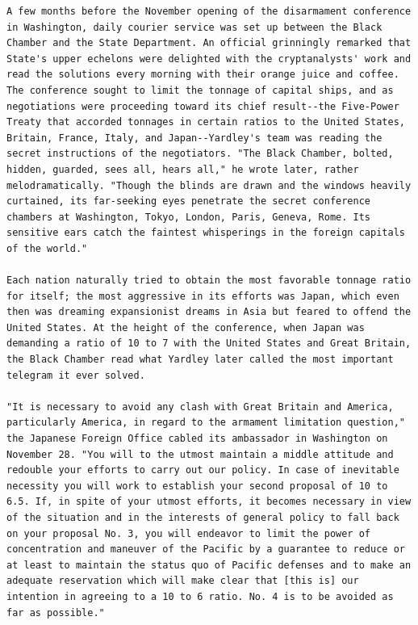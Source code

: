 \documentclass[11pt,a4paper]{article}
\begin{document}
\begin{lstlisting}[style=plaintext,caption={Recovered plaintext with restored word spacing}]
A few months before the November opening of the disarmament conference in Washington, daily courier service was set up between the Black Chamber and the State Department. An official grinningly remarked that State's upper echelons were delighted with the cryptanalysts' work and read the solutions every morning with their orange juice and coffee. The conference sought to limit the tonnage of capital ships, and as negotiations were proceeding toward its chief result--the Five-Power Treaty that accorded tonnages in certain ratios to the United States, Britain, France, Italy, and Japan--Yardley's team was reading the secret instructions of the negotiators. "The Black Chamber, bolted, hidden, guarded, sees all, hears all," he wrote later, rather melodramatically. "Though the blinds are drawn and the windows heavily curtained, its far-seeking eyes penetrate the secret conference chambers at Washington, Tokyo, London, Paris, Geneva, Rome. Its sensitive ears catch the faintest whisperings in the foreign capitals of the world."

Each nation naturally tried to obtain the most favorable tonnage ratio for itself; the most aggressive in its efforts was Japan, which even then was dreaming expansionist dreams in Asia but feared to offend the United States. At the height of the conference, when Japan was demanding a ratio of 10 to 7 with the United States and Great Britain, the Black Chamber read what Yardley later called the most important telegram it ever solved.

"It is necessary to avoid any clash with Great Britain and America, particularly America, in regard to the armament limitation question," the Japanese Foreign Office cabled its ambassador in Washington on November 28. "You will to the utmost maintain a middle attitude and redouble your efforts to carry out our policy. In case of inevitable necessity you will work to establish your second proposal of 10 to 6.5. If, in spite of your utmost efforts, it becomes necessary in view of the situation and in the interests of general policy to fall back on your proposal No. 3, you will endeavor to limit the power of concentration and maneuver of the Pacific by a guarantee to reduce or at least to maintain the status quo of Pacific defenses and to make an adequate reservation which will make clear that [this is] our intention in agreeing to a 10 to 6 ratio. No. 4 is to be avoided as far as possible."


\end{lstlisting}
\end{document}
